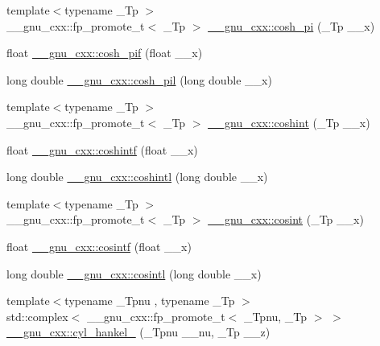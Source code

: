 \begin{DoxyCompactItemize}
{\footnotesize template$<$typename \+\_\+\+Tp $>$ }\\\+\_\+\+\_\+gnu\+\_\+cxx\+::fp\+\_\+promote\+\_\+t$<$ \+\_\+\+Tp $>$ \hyperlink{group__gnu__math__spec__func_gaf59c68a01adfdab0f22c4fb405ab2a36}{\+\_\+\+\_\+gnu\+\_\+cxx\+::cosh\+\_\+pi} (\+\_\+\+Tp \+\_\+\+\_\+x)
\item 
float \hyperlink{group__gnu__math__spec__func_ga79a2f5c9da96b5ea6c663d6efca24944}{\+\_\+\+\_\+gnu\+\_\+cxx\+::cosh\+\_\+pif} (float \+\_\+\+\_\+x)
\item 
long double \hyperlink{group__gnu__math__spec__func_gab7bf4f591dd35af2bdb88a8219f5e248}{\+\_\+\+\_\+gnu\+\_\+cxx\+::cosh\+\_\+pil} (long double \+\_\+\+\_\+x)
\item 
{\footnotesize template$<$typename \+\_\+\+Tp $>$ }\\\+\_\+\+\_\+gnu\+\_\+cxx\+::fp\+\_\+promote\+\_\+t$<$ \+\_\+\+Tp $>$ \hyperlink{group__gnu__math__spec__func_ga2411d513d418180285ace6650c7b7e31}{\+\_\+\+\_\+gnu\+\_\+cxx\+::coshint} (\+\_\+\+Tp \+\_\+\+\_\+x)
\item 
float \hyperlink{group__gnu__math__spec__func_ga1af4d48209169967a836bd97e625a128}{\+\_\+\+\_\+gnu\+\_\+cxx\+::coshintf} (float \+\_\+\+\_\+x)
\item 
long double \hyperlink{group__gnu__math__spec__func_ga6d24ab53fad13d421f07d9a9a509de14}{\+\_\+\+\_\+gnu\+\_\+cxx\+::coshintl} (long double \+\_\+\+\_\+x)
\item 
{\footnotesize template$<$typename \+\_\+\+Tp $>$ }\\\+\_\+\+\_\+gnu\+\_\+cxx\+::fp\+\_\+promote\+\_\+t$<$ \+\_\+\+Tp $>$ \hyperlink{group__gnu__math__spec__func_gafd398869cde057087e6b3428a1d13a93}{\+\_\+\+\_\+gnu\+\_\+cxx\+::cosint} (\+\_\+\+Tp \+\_\+\+\_\+x)
\item 
float \hyperlink{group__gnu__math__spec__func_ga87202351dc97d2c69e42bf58f911fb5a}{\+\_\+\+\_\+gnu\+\_\+cxx\+::cosintf} (float \+\_\+\+\_\+x)
\item 
long double \hyperlink{group__gnu__math__spec__func_ga5f01f17ae8859129860118b09d51791c}{\+\_\+\+\_\+gnu\+\_\+cxx\+::cosintl} (long double \+\_\+\+\_\+x)
\item 
{\footnotesize template$<$typename \+\_\+\+Tpnu , typename \+\_\+\+Tp $>$ }\\std\+::complex$<$ \+\_\+\+\_\+gnu\+\_\+cxx\+::fp\+\_\+promote\+\_\+t$<$ \+\_\+\+Tpnu, \+\_\+\+Tp $>$ $>$ \hyperlink{group__gnu__math__spec__func_ga5329bba77d10a9d2f15d9bbe43a70db3}{\+\_\+\+\_\+gnu\+\_\+cxx\+::cyl\+\_\+hankel\+\_} (\+\_\+\+Tpnu \+\_\+\+\_\+nu, \+\_\+\+Tp \+\_\+\+\_\+z)

\end{DoxyCompactItemize}
